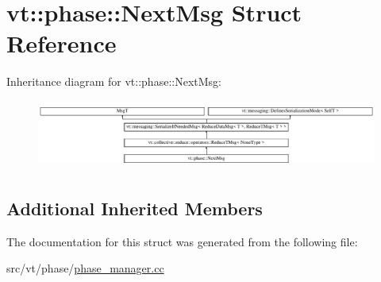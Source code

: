 \hypertarget{structvt_1_1phase_1_1_next_msg}{}\section{vt\+:\+:phase\+:\+:Next\+Msg Struct Reference}
\label{structvt_1_1phase_1_1_next_msg}
Inheritance diagram for vt\+:\+:phase\+:\+:Next\+Msg\+:\begin{figure}[H]
\begin{center}
\leavevmode
\includegraphics[height=2.299795cm]{structvt_1_1phase_1_1_next_msg}
\end{center}
\end{figure}
\subsection*{Additional Inherited Members}


The documentation for this struct was generated from the following file\+:\begin{DoxyCompactItemize}
\item 
src/vt/phase/\hyperlink{phase__manager_8cc}{phase\+\_\+manager.\+cc}\end{DoxyCompactItemize}
